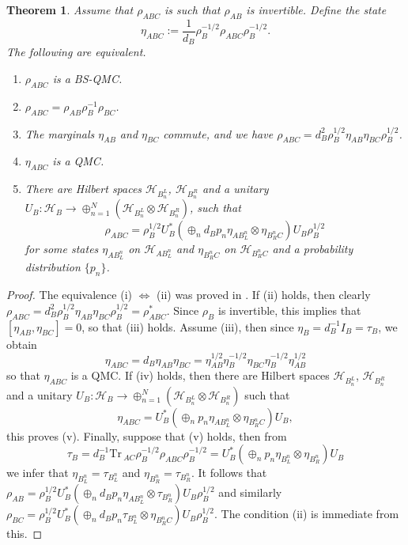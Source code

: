 \documentclass[12pt]{article}
\newtheorem{theorem}{Theorem}
\theoremstyle{definition}
\theoremstyle{remark}
\def \Tr{\mathrm{Tr}\,}
\begin{document}
\begin{theorem}\label{theo:StructureBSDPI} Assume that $\rho_{ABC}$ is such that $\rho_{AB}$ is
invertible. Define the state
\[
\eta_{ABC}:=\frac1{d_B}\rho_B^{-1/2}\rho_{ABC}\rho_B^{-1/2}.
\]
The following are equivalent.

\begin{enumerate}
\item[(i)] $\rho_{ABC}$ is a BS-QMC.
\item[(ii)] $\rho_{ABC}=\rho_{AB}\rho_B^{-1}\rho_{BC}$.
\item[(iii)] The marginals $\eta_{AB}$ and $\eta_{BC}$ commute, and we have
$\rho_{ABC}=d_B^2\rho_B^{1/2}\eta_{AB}\eta_{BC}\rho_{B}^{1/2}$.
\item[(iv)] $\eta_{ABC}$ is a QMC.
\item[(v)] There are Hilbert spaces  $\mathcal{H}_{B_n^L}$, $\mathcal{H}_{B_n^R}$ and a
unitary  $\displaystyle U_B:\mathcal{H}_B \to \oplus_{n=1}^N\left( \mathcal{H}_{B_n^L} \otimes \mathcal{H}_{B_n^R}\right)$,
 such that 
\[
\rho_{ABC}=\rho_B^{1/2}U^*_B\left(\oplus_n d_Bp_n \eta_{AB_{L}^n}\otimes
\eta_{B_R^nC}\right)U_B\rho_B^{1/2}
\]
for some states $\eta_{AB_L^n}$ on $\mathcal {H}_{AB_L^n}$ and $\eta_{B_R^nC}$ on $\mathcal {H}_{B_R^nC}$
and a probability distribution $\{p_n\}$.

\end{enumerate}

\end{theorem}



\begin{proof} The equivalence (i) $\iff$ (ii) was proved in
\cite{BluhmCapel-BSentropy-2019}. If (ii) holds, then 
clearly $\rho_{ABC}=d_B^2\rho_B^{1/2}\eta_{AB}\eta_{BC}\rho_B^{1/2}=\rho_{ABC}^*$.
Since $\rho_B$ is invertible, this implies that 
$[\eta_{AB},\eta_{BC}]=0$, so that (iii) holds. 
Assume (iii), then since $\eta_B=d_B^{-1}I_B=\tau_B$, we obtain 
\[
\eta_{ABC}=d_B\eta_{AB}\eta_{BC}=\eta_{AB}^{1/2}\eta_B^{-1/2}\eta_{BC}\eta_B^{-1/2}\eta_{AB}^{1/2}
\]
so that $\eta_{ABC}$ is a QMC. If (iv) holds, then there are Hilbert spaces $\mathcal{H}_{B_n^L}$, $\mathcal{H}_{B_n^R}$ and a
unitary  $U_B:\mathcal{H}_B \to \oplus_{n=1}^N\left( \mathcal{H}_{B_n^L} \otimes \mathcal{H}_{B_n^R}\right)$ such that
\[
\eta_{ABC}=U^*_B\left(\oplus_n p_n \eta_{AB_{L}^n}\otimes
\eta_{B_R^nC}\right)U_B,
\]
this proves (v). Finally, suppose that (v) holds, then from
\[
\tau_B=d_B^{-1}\Tr_{AC}\rho_B^{-1/2}\rho_{ABC}\rho_B^{-1/2}=U_B^*\left(\oplus_n p_n\eta_{B_L^n}\otimes
\eta_{B_R^n}\right)U_B
\]
we infer that $\eta_{B_L^n}=\tau_{B_L^n}$ and $\eta_{B_R^n}=\tau_{B_R^n}$. It follows that
$\rho_{AB}=\rho_B^{1/2}U^*_B\left(\oplus_n d_Bp_n\eta_{AB_L^n}\otimes
\tau_{B_R^n}\right)U_B\rho_B^{1/2}$ and
similarly $\rho_{BC}=\rho_B^{1/2}U^*_B\left(\oplus_n d_Bp_n\tau_{B_L^n}\otimes
\eta_{B_R^nC}\right)U_B\rho_B^{1/2}$. The condition (ii) is immediate from this.



\end{proof}
\end{document}
